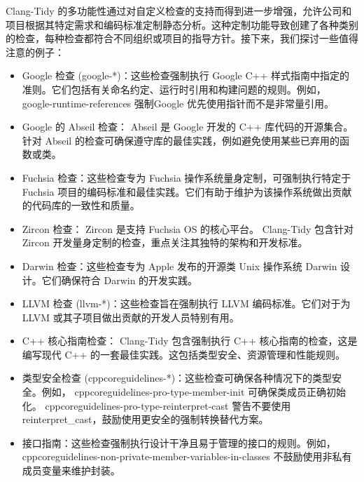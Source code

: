 
Clang-Tidy 的多功能性通过对自定义检查的支持而得到进一步增强，允许公司和项目根据其特定需求和编码标准定制静态分析。这种定制功能导致创建了各种类别的检查，每种检查都符合不同组织或项目的指导方针。接下来，我们探讨一些值得注意的例子：

\begin{itemize}
\item
Google 检查 (google-*)：这些检查强制执行 Google C++ 样式指南中指定的准则。它们包括有关命名约定、运行时引用和构建问题的规则。例如， google-runtime-references 强制Google 优先使用指针而不是非常量引用。

\item
Google 的 Abseil 检查： Abseil 是 Google 开发的 C++ 库代码的开源集合。针对 Abseil 的检查可确保遵守库的最佳实践，例如避免使用某些已弃用的函数或类。

\item
Fuchsia 检查：这些检查专为 Fuchsia 操作系统量身定制，可强制执行特定于 Fuchsia 项目的编码标准和最佳实践。它们有助于维护为该操作系统做出贡献的代码库的一致性和质量。

\item
Zircon 检查： Zircon 是支持 Fuchsia OS 的核心平台。 Clang-Tidy 包含针对 Zircon 开发量身定制的检查，重点关注其独特的架构和开发标准。

\item
Darwin 检查：这些检查专为 Apple 发布的开源类 Unix 操作系统 Darwin 设计。它们确保符合 Darwin 的开发实践。

\item
LLVM 检查 (llvm-*)：这些检查旨在强制执行 LLVM 编码标准。它们对于为 LLVM 或其子项目做出贡献的开发人员特别有用。

\item
C++ 核心指南检查： Clang-Tidy 包含强制执行 C++ 核心指南的检查，这是编写现代 C++ 的一套最佳实践。这包括类型安全、资源管理和性能规则。

\item
类型安全检查 (cppcoreguidelines-*)：这些检查可确保各种情况下的类型安全。例如， cppcoreguidelines-pro-type-member-init 可确保类成员正确初始化。 cppcoreguidelines-pro-type-reinterpret-cast 警告不要使用 reinterpret\_cast，鼓励使用更安全的强制转换替代方案。

\item
接口指南：这些检查强制执行设计干净且易于管理的接口的规则。例如， cppcoreguidelines-non-private-member-variables-in-classes 不鼓励使用非私有成员变量来维护封装。


\end{itemize}

